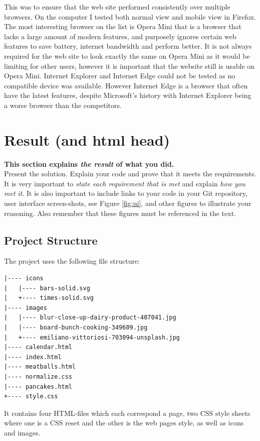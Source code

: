 \documentclass[a4paper]{scrartcl}
\begin{document}
This was to ensure that the web site performed consistently over multiple browsers. On the computer I tested both normal view and mobile view in Firefox. The most interesting browser on the list is Opera Mini that is a browser that lacks a large amount of modern features, and purposely ignores certain web features to save battery, internet bandwidth and perform better. It is not always required for the web site to look exactly the same on Opera Mini as it would be limiting for other users, however it is important that the website still is usable on Opera Mini. Internet Explorer and Internet Edge could not be tested as no compatible device was available. However Internet Edge is a browser that often have the latest features, despite Microsoft's history with Internet Explorer being a worse browser than the competitors.

\section{Result (and html head)}

\textbf{This section explains \textit{the result} of what you did.} \\

\noindent Present the solution. Explain your code and prove that it meets the requirements. It is very important to \textit{state each requirement that is met} and explain \textit{how you met it}. It is also important to include links to your code in your Git repository, user interface screen-shots, see Figure \ref{fig:ui}, and other figures to illustrate your reasoning. Also remember that these figures must be referenced in the text.

\subsection{Project Structure}
The project uses the following file structure:

\begin{verbatim}
|---- icons
|   |---- bars-solid.svg
|   +---- times-solid.svg
|---- images
|   |---- blur-close-up-dairy-product-407041.jpg
|   |---- board-bunch-cooking-349609.jpg
|   +---- emiliano-vittoriosi-703094-unsplash.jpg
|---- calendar.html
|---- index.html
|---- meatballs.html
|---- normalize.css
|---- pancakes.html
+---- style.css
\end{verbatim}

\noindent
It contains four HTML-files which each correspond a page, two CSS style sheets where one is a CSS reset and the other is the web pages style, as well as icons and images.
\end{document}
